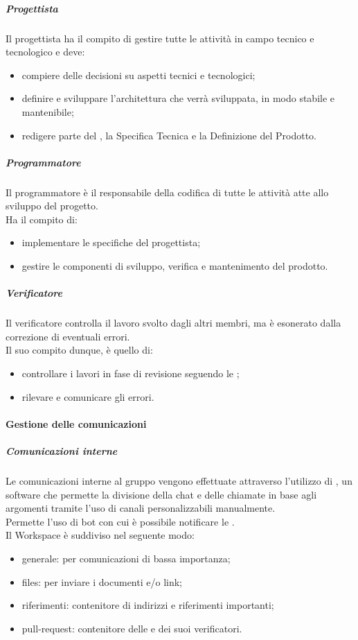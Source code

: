     		\subparagraph{Progettista}
    		Il progettista ha il compito di gestire tutte le attività in campo tecnico e tecnologico e deve:
    		\begin{itemize}
    			\item compiere delle decisioni su aspetti tecnici e tecnologici;
    			\item definire e sviluppare l'architettura che verrà sviluppata, in modo stabile e mantenibile;
    			\item redigere parte del , la Specifica Tecnica e la Definizione del Prodotto.
    		\end{itemize}

    		\subparagraph{Programmatore}
    		Il programmatore è il responsabile della codifica di tutte le attività atte allo sviluppo del progetto.\\
    		Ha il compito di:
    		\begin{itemize}
    			\item implementare le specifiche del progettista;
    			\item gestire le componenti di sviluppo, verifica e mantenimento del prodotto.
    		\end{itemize}

    		\subparagraph{Verificatore}
    		Il verificatore controlla il lavoro svolto dagli altri membri, ma è esonerato dalla correzione di eventuali errori.\\
    		Il suo compito dunque, è quello di:

    		\begin{itemize}
    			\item controllare i lavori in fase di revisione seguendo le ;
    			\item rilevare e comunicare gli errori.
    		\end{itemize}

		\paragraph{Gestione delle comunicazioni}
    		\subparagraph{Comunicazioni interne}
    		Le comunicazioni interne al gruppo vengono effettuate attraverso l'utilizzo di , un software che permette la divisione della chat e delle chiamate in base agli argomenti tramite l'uso di canali personalizzabili manualmente. \\ Permette l'uso di bot con cui è possibile notificare le .\\
    		Il Workspace è suddiviso nel seguente modo:
    		\begin{itemize}
    		 	\item {\ttfamily generale}: per comunicazioni di bassa importanza;
    		 	\item {\ttfamily files}: per inviare i documenti e/o link;
    		 	\item {\ttfamily riferimenti}: contenitore di indirizzi e riferimenti importanti;
    		    \item {\ttfamily pull-request}: contenitore delle  e dei suoi verificatori.
    		\end{itemize}

